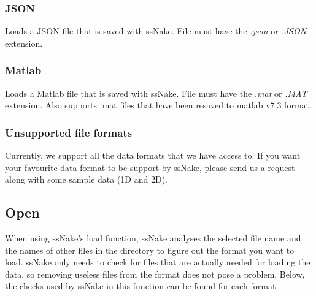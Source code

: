 \documentclass[11pt,a4paper]{article}
\begin{document}
\subsubsection*{JSON}
Loads a JSON file that is saved with ssNake. File must have the \textit{.json} or \textit{.JSON} extension.

\subsubsection*{Matlab}
Loads a Matlab file that is saved with ssNake. File must have the \textit{.mat} or \textit{.MAT} extension. Also supports .mat files that have been resaved to matlab v7.3 format.


\subsubsection*{Unsupported file formats}
Currently, we support all the data formats that we have access to. If you want your favourite data format to be support by ssNake, please send us a request along with some sample data (1D and 2D).

\subsection{Open}
When using ssNake's load function, ssNake analyses the selected file name and the names of other files in the directory to figure out the format you want to load. ssNake only needs to check for files that are actually needed for loading the data, so removing useless files from the format does not pose a problem. Below, the checks used by ssNake in this function can be found for each format.
\end{document}
